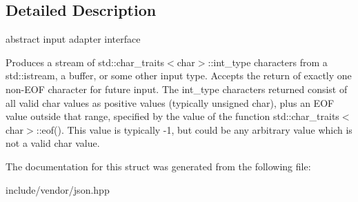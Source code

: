 \subsection{Detailed Description}
abstract input adapter interface 

Produces a stream of std\+::char\+\_\+traits$<$char$>$\+::int\+\_\+type characters from a std\+::istream, a buffer, or some other input type. Accepts the return of exactly one non-\/\+E\+OF character for future input. The int\+\_\+type characters returned consist of all valid char values as positive values (typically unsigned char), plus an E\+OF value outside that range, specified by the value of the function std\+::char\+\_\+traits$<$char$>$\+::eof(). This value is typically -\/1, but could be any arbitrary value which is not a valid char value. 

The documentation for this struct was generated from the following file\+:\begin{DoxyCompactItemize}
\item 
include/vendor/json.\+hpp\end{DoxyCompactItemize}

